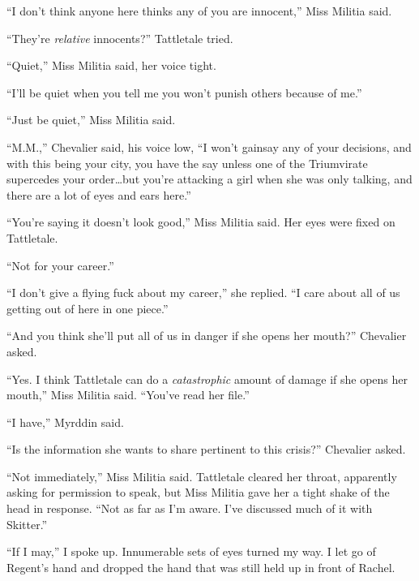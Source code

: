 ``I don't think anyone here thinks any of you are innocent,'' Miss Militia said.



``They're \emph{relative} innocents?'' Tattletale tried.



``Quiet,'' Miss Militia said, her voice tight.



``I'll be quiet when you tell me you won't punish others because of me.''



``Just be quiet,'' Miss Militia said.



``M.M.,'' Chevalier said, his voice low, ``I won't gainsay any of your decisions, and with this being your city, you have the say unless one of the Triumvirate supercedes your order\ldots but you're attacking a girl when she was only talking, and there are a lot of eyes and ears here.''



``You're saying it doesn't look good,'' Miss Militia said.  Her eyes were fixed on Tattletale.



``Not for your career.''



``I don't give a flying fuck about my career,'' she replied.  ``I care about all of us getting out of here in one piece.''



``And you think she'll put all of us in danger if she opens her mouth?'' Chevalier asked.



``Yes.  I think Tattletale can do a \emph{catastrophic} amount of damage if she opens her mouth,'' Miss Militia said.  ``You've read her file.''



``I have,'' Myrddin said.



``Is the information she wants to share pertinent to this crisis?''  Chevalier asked.



``Not immediately,'' Miss Militia said.  Tattletale cleared her throat, apparently asking for permission to speak, but Miss Militia gave her a tight shake of the head in response.  ``Not as far as I'm aware.  I've discussed much of it with Skitter.''



``If I may,'' I spoke up.  Innumerable sets of eyes turned my way.  I let go of Regent's hand and dropped the hand that was still held up in front of Rachel.



